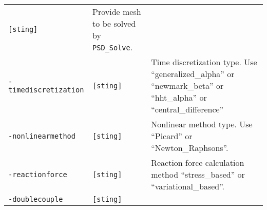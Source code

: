 \begin{longtable}[]{@{}lll@{}}
\begin{minipage}[t]{0.09\columnwidth}
\lstinline![sting]!\strut
\end{minipage} & \begin{minipage}[t]{0.56\columnwidth}\raggedright\strut
Provide mesh to be solved by \lstinline!PSD_Solve!.\strut
\end{minipage}\tabularnewline
\begin{minipage}[t]{0.26\columnwidth}\raggedright\strut
\lstinline!-timediscretization!\strut
\end{minipage} & \begin{minipage}[t]{0.09\columnwidth}\raggedright\strut
\lstinline![sting]!\strut
\end{minipage} & \begin{minipage}[t]{0.56\columnwidth}\raggedright\strut
Time discretization type. Use ``generalized\_alpha'' or
``newmark\_beta'' or ``hht\_alpha'' or ``central\_difference''\strut
\end{minipage}\tabularnewline
\begin{minipage}[t]{0.26\columnwidth}\raggedright\strut
\lstinline!-nonlinearmethod!\strut
\end{minipage} & \begin{minipage}[t]{0.09\columnwidth}\raggedright\strut
\lstinline![sting]!\strut
\end{minipage} & \begin{minipage}[t]{0.56\columnwidth}\raggedright\strut
Nonlinear method type. Use ``Picard'' or ``Newton\_Raphsons''.\strut
\end{minipage}\tabularnewline
\begin{minipage}[t]{0.26\columnwidth}\raggedright\strut
\lstinline!-reactionforce!\strut
\end{minipage} & \begin{minipage}[t]{0.09\columnwidth}\raggedright\strut
\lstinline![sting]!\strut
\end{minipage} & \begin{minipage}[t]{0.56\columnwidth}\raggedright\strut
Reaction force calculation method ``stress\_based'' or
``variational\_based''.\strut
\end{minipage}\tabularnewline
\begin{minipage}[t]{0.26\columnwidth}\raggedright\strut
\lstinline!-doublecouple!\strut
\end{minipage} & \begin{minipage}[t]{0.09\columnwidth}\raggedright\strut
\lstinline![sting]!\strut
\end{minipage} & \begin{minipage}[t]{0.56\columnwidth}\raggedright\strut

\end{minipage}
\end{longtable}
